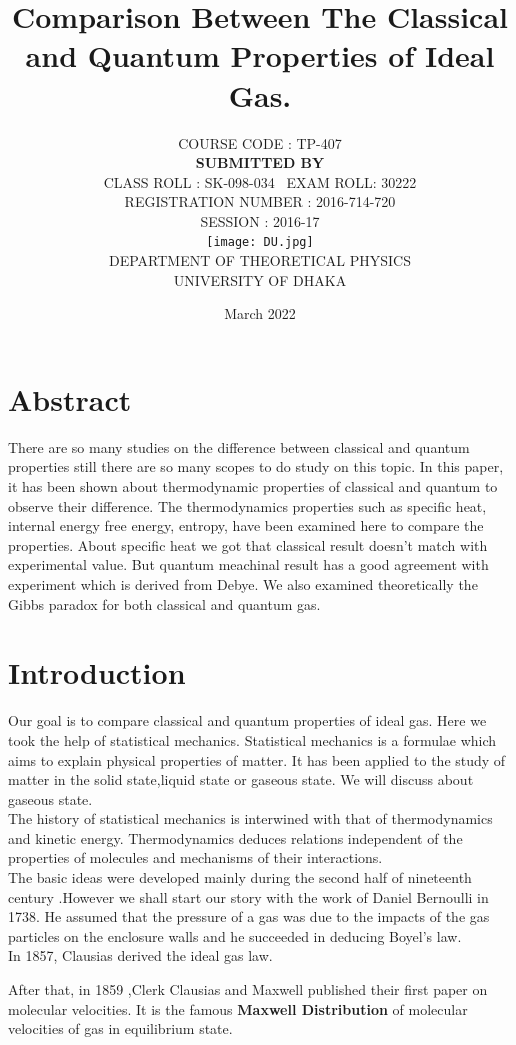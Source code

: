 \documentclass{article}
\title{Comparison Between The Classical and Quantum Properties of Ideal Gas.}
\author{ COURSE CODE : TP-407 \\ \textbf{SUBMITTED BY}
 \\  CLASS ROLL : SK-098-034 \  EXAM ROLL: 30222 \\
 REGISTRATION NUMBER : 2016-714-720 \\     SESSION : 2016-17
\\ 
\texttt{[image: DU.jpg]} \\  DEPARTMENT OF THEORETICAL PHYSICS \\ UNIVERSITY OF DHAKA 
}
\date{March 2022}
\newcommand*{\1}{\hspace{1pt}}
\begin{document}
\maketitle
\newpage
\tableofcontents
\listoffigures

\newpage
\section*{Abstract}
    There are so many studies on the difference between classical and quantum properties still there are so many scopes to do study on this topic. In this paper, it 
    has been shown about thermodynamic properties of classical and quantum to observe their difference. The thermodynamics properties such as specific heat, internal energy
    free energy, entropy, have been examined here to compare the properties. About specific heat we got that classical result doesn't match with experimental value.
    But quantum meachinal result has a good agreement with experiment which is derived from Debye. We also examined theoretically the Gibbs paradox for both classical
    and quantum gas.   
\newpage
\section{Introduction}
Our goal is to compare classical and quantum properties of ideal gas. Here we took the help of statistical mechanics. Statistical mechanics is a formulae which aims to explain physical properties of matter. It has been applied to the study of matter in the solid state,liquid state or gaseous state. We will discuss about gaseous state.\\



The history of statistical mechanics is interwined with that of thermodynamics and kinetic energy.  Thermodynamics deduces relations independent of the properties of molecules and mechanisms of their interactions.\\


The basic ideas were developed mainly during the second half of nineteenth century .However we shall start our story with the work of Daniel Bernoulli in 1738. He assumed that the pressure of a gas was due to the impacts of the gas particles on the enclosure walls and he succeeded in deducing Boyel's law.\\


In 1857, Clausias derived the ideal gas law.

After that, in 1859 ,Clerk Clausias and Maxwell published their first paper on molecular velocities. It is the famous \textbf{Maxwell Distribution}\cite{l3} of molecular velocities of gas in equilibrium state.\\
\end{document}
